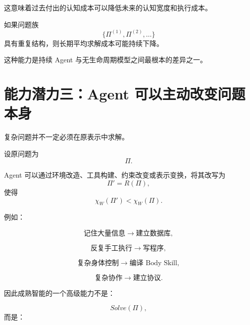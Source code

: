 这意味着过去付出的认知成本可以降低未来的认知宽度和执行成本。

如果问题族
\begin{equation}
\{\Pi^{(1)},\Pi^{(2)},\ldots\}
\end{equation}
具有重复结构，则长期平均求解成本可能持续下降。

这种能力是持续 Agent 与无生命周期模型之间最根本的差异之一。

\section{能力潜力三：Agent 可以主动改变问题本身}

复杂问题并不一定必须在原表示中求解。

设原问题为
\begin{equation}
\Pi.
\end{equation}

Agent 可以通过环境改造、工具构建、约束改变或表示变换，将其改写为
\begin{equation}
\Pi'
=
R(\Pi),
\end{equation}
使得
\begin{equation}
\chi_W(\Pi')
<
\chi_W(\Pi).
\end{equation}

例如：

\begin{equation}
\text{记住大量信息}
\rightarrow
\text{建立数据库},
\end{equation}

\begin{equation}
\text{反复手工执行}
\rightarrow
\text{写程序},
\end{equation}

\begin{equation}
\text{复杂身体控制}
\rightarrow
\text{编译 Body Skill},
\end{equation}

\begin{equation}
\text{复杂协作}
\rightarrow
\text{建立协议}.
\end{equation}

因此成熟智能的一个高级能力不是：

\begin{equation}
Solve(\Pi),
\end{equation}
而是：
\begin{statementbox}
\centering
{}
\end{statementbox}

